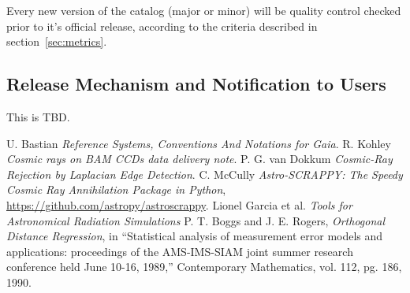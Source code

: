 \documentclass[a4paper, 11pt]{article}
\begin{document}
Every new version of the catalog (major or minor) will be quality control checked prior to it's official release, according to the criteria described in section~\ref{sec:metrics}.

\subsection{Release Mechanism and Notification to Users}

This is TBD.


\begin{thebibliography}{9}
 U. Bastian \emph{Reference Systems, Conventions And Notations for Gaia}.
 R. Kohley \emph{Cosmic rays on BAM CCDs data delivery note}.
 P. G. van Dokkum \emph{Cosmic-Ray Rejection by Laplacian Edge Detection}.
 C. McCully \emph{Astro-SCRAPPY: The Speedy Cosmic Ray Annihilation Package in Python}, \url{https://github.com/astropy/astroscrappy}.
 Lionel Garcia et al. \emph{Tools for Astronomical Radiation Simulations}
 P. T. Boggs and J. E. Rogers, \emph{Orthogonal Distance Regression}, in ``Statistical analysis of measurement error models and applications: proceedings of the AMS-IMS-SIAM joint summer research conference held June 10-16, 1989,'' Contemporary Mathematics, vol. 112, pg. 186, 1990.


\end{thebibliography}
\end{document}
